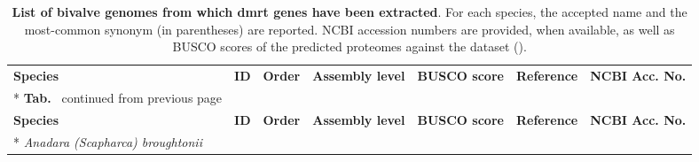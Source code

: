\begin{landscape}
	\footnotesize
	\begin{longtable}[c]{@{}lllllll@{}}
		\caption[\textbf{List of bivalve genomes from which \gls{dmrt} genes have been extracted}]
		{
			\textbf{List of bivalve genomes from which \gls{dmrt} genes have been extracted}. For each species, the accepted name and the most-common synonym (in parentheses) are reported. NCBI accession numbers are provided, when available, as well as BUSCO scores of the predicted proteomes against the  dataset ().
		}
		\label{tab:genomes}                                                                               \\
		\toprule
		\textbf{Species}                                                                                &
		\textbf{ID}                                                                                     &
		\textbf{Order}                                                                                  &
		\textbf{Assembly level}                                                                         &
		\textbf{BUSCO score}                                                                            &
		\textbf{Reference}                                                                              &
		\textbf{NCBI Acc. No.}                                                                            \\* \hline \hline
		\endfirsthead
		\multicolumn{7}{c}%
		{\textbf{Tab. \thetable}\ continued from previous page}                                       \\
		\toprule
		\textbf{Species}                                                                                &
		\textbf{ID}                                                                                     &
		\textbf{Order}                                                                                  &
		\textbf{Assembly level}                                                                         &
		\textbf{BUSCO score}                                                                            &
		\textbf{Reference}                                                                              &
		\textbf{NCBI Acc. No.}                                                                            \\* \hline \hline
		\endhead
		\endfoot
		\endlastfoot
		\textit{Anadara (Scapharca) broughtonii}                                                        &

\end{longtable}
\end{landscape}

